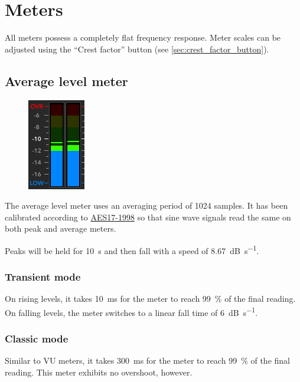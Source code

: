 \chapter{Meters}
\label{chap:meters}

All meters possess a completely flat frequency response.  Meter scales
can be adjusted using the ``Crest factor'' button (see
\ref{sec:crest_factor_button}).

\section{Average level meter}

\begin{figure}
  \includegraphics[scale=0.625,clip]{include/images/level_meter_average.png}
\end{figure}

The average level meter uses an averaging period of \num{1024}
samples.  It has been calibrated according to
\href{http://www.aes.org/publications/standards/search.cfm?docID=21}{AES17-1998}
so that sine wave signals read the same on both peak and average
meters.

Peaks will be held for \SI{10}{\second} and then fall with a speed of
\SI{8.67}{\dB\per\second}.

\subsection{Transient mode}

On rising levels, it takes \SI{10}{\milli\second} for the meter to
reach \SI{99}{\percent} of the final reading.  On falling levels, the
meter switches to a linear fall time of \SI{6}{\dB\per\second}.

\subsection{Classic mode}

Similar to VU meters, it takes \SI{300}{\milli\second} for the meter
to reach \SI{99}{\percent} of the final reading.  This meter exhibits
no overshoot, however.

